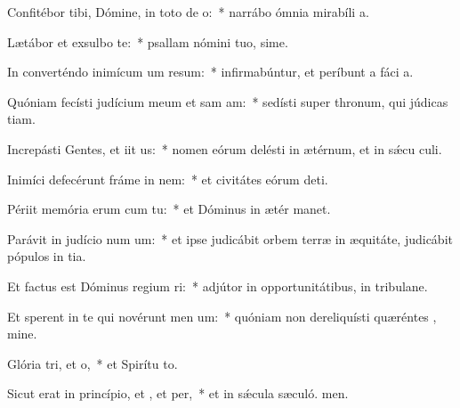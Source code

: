 \item Confitébor tibi, Dómine, in toto de o:~* narrábo ómnia mirabíli a.
\item Lætábor et exsulbo  te:~* psallam nómini tuo, sime.
\item In converténdo inimícum um resum:~* infirmabúntur, et períbunt a fáci a.
\item Quóniam fecísti judícium meum et sam am:~* sedísti super thronum, qui júdicas tiam.
\item Increpásti Gentes, et iit us:~* nomen eórum delésti in ætérnum, et in sǽcu culi.
\item Inimíci defecérunt fráme in nem:~* et civitátes eórum deti.
\item Périit memória erum cum tu:~* et Dóminus in ætér manet.
\item Parávit in judício num um:~* et ipse judicábit orbem terræ in æquitáte, judicábit pópulos in tia.
\item Et factus est Dóminus regium ri:~* adjútor in opportunitátibus, in tribulane.
\item Et sperent in te qui novérunt men um:~* quóniam non dereliquísti quæréntes , mine.
\item Glória tri, et o,~* et Spirítu to.
\item Sicut erat in princípio, et , et per,~* et in sǽcula sæculó. men.
